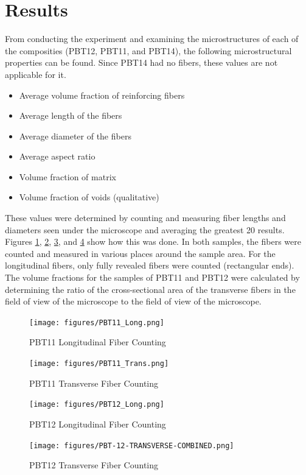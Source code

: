 \documentclass[11pt]{article}
\begin{document}
\section{Results}
From conducting the experiment and examining the microstructures of each of the composities (PBT12, PBT11, and PBT14), the following microstructural properties can be found. Since PBT14 had no fibers, these values are not applicable for it.

\begin{itemize}
\item Average volume fraction of reinforcing fibers
\item Average length of the fibers
\item Average diameter of the fibers
\item Average aspect ratio
\item Volume fraction of matrix
\item Volume fraction of voids (qualitative)
\end{itemize}

These values were determined by counting and measuring fiber lengths and diameters seen under the microscope and averaging the greatest 20 results. Figures \ref{pbt11longcount}, \ref{pbt11transcount}, \ref{pbt12longcount}, and \ref{pbt12transcount} show how this was done. In both samples, the fibers were counted and measured in various places around the sample area. For the longitudinal fibers, only fully revealed fibers were counted (rectangular ends). The volume fractions for the samples of PBT11 and PBT12 were calculated by determining the ratio of the cross-sectional area of the transverse fibers in the field of view of the microscope to the field of view of the microscope.

\begin{figure}[H]
\centering
\texttt{[image: figures/PBT11\_Long.png]}
\caption{PBT11 Longitudinal Fiber Counting}
\label{pbt11longcount}
\end{figure}
\begin{figure}[H]
\centering
\texttt{[image: figures/PBT11\_Trans.png]}
\caption{PBT11 Transverse Fiber Counting}
\label{pbt11transcount}
\end{figure}
\begin{figure}[H]
\centering
\texttt{[image: figures/PBT12\_Long.png]}
\caption{PBT12 Longitudinal Fiber Counting}
\label{pbt12longcount}
\end{figure}
\begin{figure}[H]
\centering
\texttt{[image: figures/PBT-12-TRANSVERSE-COMBINED.png]}
\caption{PBT12 Transverse Fiber Counting}
\label{pbt12transcount}
\end{figure}
\end{document}
